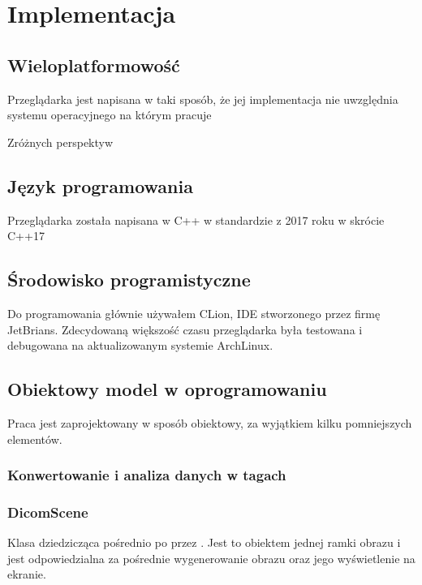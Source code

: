 \section{Implementacja}

\subsection{Wieloplatformowość}

Przeglądarka jest napisana w taki sposób, że jej implementacja nie uwzględnia systemu operacyjnego na którym pracuje

Zróżnych perspektyw

\subsection{Język programowania}

Przeglądarka została napisana w C++ w standardzie z 2017 roku w skrócie C++17

\subsection{Środowisko programistyczne}

Do programowania głównie używałem CLion, IDE stworzonego przez firmę JetBrians.
Zdecydowaną większość czasu przeglądarka była testowana i debugowana na aktualizowanym systemie ArchLinux.

\subsection{Obiektowy model w oprogramowaniu}

Praca jest zaprojektowany w sposób obiektowy, za wyjątkiem kilku pomniejszych elementów.


\subsubsection{Konwertowanie i analiza danych w tagach}


\subsubsection{DicomScene}

Klasa dziedzicząca pośrednio po  przez .
Jest to obiektem jednej ramki obrazu i jest odpowiedzialna za pośrednie wygenerowanie obrazu oraz jego wyświetlenie na ekranie.

